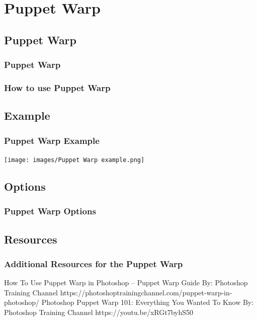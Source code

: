 \documentclass{beamer}
\begin{document}
\section{Puppet Warp}

\subsection{Puppet Warp}		

\begin{frame}
	\frametitle{Puppet Warp}
	\begin{outline}
		\1 
	\end{outline}
\end{frame}

	\begin{frame}
	\frametitle{How to use Puppet Warp}
	\begin{outline}
		\1 
	\end{outline}
\end{frame}

\subsection{Example}		
\begin{frame}
	\frametitle{Puppet Warp Example}
	\begin{center}
		\texttt{[image: images/Puppet Warp example.png]}
	\end{center}
\end{frame}

\subsection{Options}		
\begin{frame}
	\frametitle{Puppet Warp Options}
	\begin{outline}
		\1 
	\end{outline}
\end{frame}

\subsection{Resources}		
\begin{frame}
	\frametitle{Additional Resources for the Puppet Warp}
	\begin{outline}
		\1 How To Use Puppet Warp in Photoshop – Puppet Warp Guide
		\2  By:  Photoshop Training Channel
		\2 https://photoshoptrainingchannel.com/puppet-warp-in-photoshop/
		\1 Photoshop Puppet Warp 101: Everything You Wanted To Know
		\2  By:  Photoshop Training Channel
		\2 https://youtu.be/xRGt7byhS50
	\end{outline}
\end{frame}
	
\end{document}
